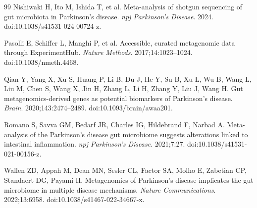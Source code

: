 \documentclass[11pt]{article}
\begin{document}
\begin{thebibliography}{99}
Nishiwaki H, Ito M, Ishida T, et al. Meta-analysis of shotgun sequencing of gut microbiota in Parkinson's disease. \textit{npj Parkinson's Disease}. 2024. doi:10.1038/s41531-024-00724-z.

Pasolli E, Schiffer L, Manghi P, et al. Accessible, curated metagenomic data through ExperimentHub. \textit{Nature Methods}. 2017;14:1023--1024. doi:10.1038/nmeth.4468.

Qian Y, Yang X, Xu S, Huang P, Li B, Du J, He Y, Su B, Xu L, Wu B, Wang L, Liu M, Chen S, Wang X, Jin H, Zhang L, Li H, Zhang Y, Liu J, Wang H. Gut metagenomics-derived genes as potential biomarkers of Parkinson's disease. \textit{Brain}. 2020;143:2474--2489. doi:10.1093/brain/awaa201.

Romano S, Savva GM, Bedarf JR, Charles IG, Hildebrand F, Narbad A. Meta-analysis of the Parkinson's disease gut microbiome suggests alterations linked to intestinal inflammation. \textit{npj Parkinson's Disease}. 2021;7:27. doi:10.1038/s41531-021-00156-z.

Wallen ZD, Appah M, Dean MN, Sesler CL, Factor SA, Molho E, Zabetian CP, Standaert DG, Payami H. Metagenomics of Parkinson's disease implicates the gut microbiome in multiple disease mechanisms. \textit{Nature Communications}. 2022;13:6958. doi:10.1038/s41467-022-34667-x.

\end{thebibliography}
\end{document}

